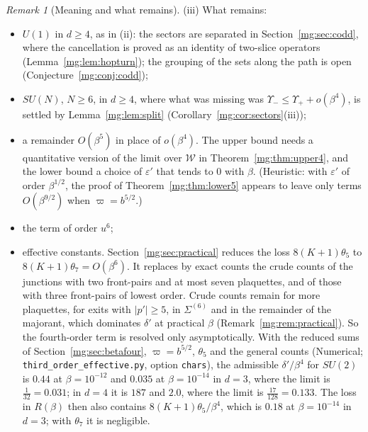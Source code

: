 \documentclass[11pt,a4paper]{article}
\theoremstyle{definition}
\theoremstyle{remark}
\newtheorem{remark}[theorem]{Remark}
\begin{document}
\begin{remark}[Meaning and what remains]
(iii) What remains:
\begin{itemize}
\item $U(1)$ in $d\ge4$, as in (ii): the sectors are separated in Section~\ref{mg:sec:codd}, where the cancellation is proved as an identity of two-slice operators
(Lemma~\ref{mg:lem:hopturn}); the grouping of the sets along the path is open (Conjecture~\ref{mg:conj:codd});
\item $SU(N)$, $N\ge6$, in $d\ge4$, where what was missing was $\Upsilon_-\le\Upsilon_++o(\beta^4)$, is settled by Lemma~\ref{mg:lem:split} (Corollary~\ref{mg:cor:sectors}(iii));
\item a remainder $O(\beta^5)$ in place of $o(\beta^4)$. The upper bound needs a quantitative version of the limit over $\mathcal W$ in Theorem~\ref{mg:thm:upper4}, and the
lower bound a choice of $\varepsilon'$ that tends to $0$ with $\beta$. (Heuristic: with $\varepsilon'$ of order $\beta^{1/2}$, the proof of Theorem~\ref{mg:thm:lower5} appears to
leave only terms $O(\beta^{9/2})$ when $\varpi=b^{5/2}$.)
\item the term of order $u^6$;
\item effective constants. Section~\ref{mg:sec:practical} reduces the loss $8(K+1)\theta_5$ to $8(K+1)\theta_7=O(\beta^6)$. It replaces by exact counts the crude counts of the junctions with
two front-pairs and at most seven plaquettes, and of those with three front-pairs of lowest order. Crude counts remain for more plaquettes, for exits with $|p'|\ge5$, in $\Sigma^{(6)}$
and in the remainder of the majorant, which dominates $\delta'$ at practical $\beta$ (Remark~\ref{mg:rem:practical}). So the fourth-order term is resolved only asymptotically. With the
reduced sums of Section~\ref{mg:sec:betafour}, $\varpi=b^{5/2}$, $\theta_5$ and the general counts (Numerical; \texttt{third\_order\_effective.py}, option \texttt{chars}), the admissible
$\delta'/\beta^4$ for $SU(2)$ is $0.44$ at $\beta=10^{-12}$ and $0.035$ at $\beta=10^{-14}$ in $d=3$, where the limit is $\frac1{32}=0.031$; in $d=4$ it is $187$ and $2.0$,
where the limit is $\frac{17}{128}=0.133$. The loss in $R(\beta)$ then also contains $8(K+1)\theta_5/\beta^4$, which is $0.18$ at $\beta=10^{-14}$ in $d=3$; with $\theta_7$ it is
negligible.
\end{itemize}


\end{remark}
\end{document}
